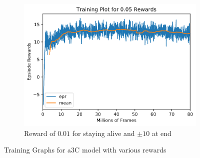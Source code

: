 \begin{figure}[h!]
    \begin{subfigure}{0.49\textwidth}
        \centering
        \includegraphics[width=\textwidth]{figures/a3c-training-0-05.png}
        \caption{Reward of $0.01$ for staying alive and $\pm 10$ at end}
        \label{fig:training-a3c-01}
    \end{subfigure}
    \caption{Training Graphs for a3C model with various rewards}
    \label{fig:a3c-training}
\end{figure}

